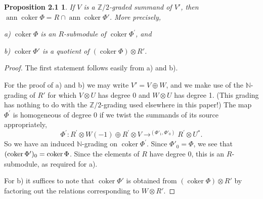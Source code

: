 \documentclass{tran-l}
\theoremstyle{plain}
\newtheorem*{theorem11}{Proposition 2.1}
\theoremstyle{remark}
\theoremstyle{definition}
\newcommand{\coker}{\operatorname{coker}}
\newcommand{\ann}{\operatorname{ann}}
\newcommand{\NN}{\mathbb {N}}
\newcommand{\ZZ}{\mathbb {Z}}
\begin{document}
\begin{theorem11}
If $V$ is a $\ZZ /2$-graded
summand of $V'$,
then
$\ann \coker \Phi =R\cap \ann \coker \Phi '$. More precisely,

\textup{a)} $\coker \Phi $ is an $R$-submodule of $\coker \Phi ^{\prime }$, and 

\textup{b)} $\coker \Phi '$ is a quotient of
$(\coker \Phi )\otimes R'$.
\end{theorem11}
\begin{proof} The first statement follows
easily from a) and b).

For the proof of a) and b) we may write
$V'=V\oplus W$, and we  make
use of the $\NN $-grading of $R'$ for which $V\otimes U$
has degree 0 and $W\otimes U$ has degree 1. (This grading
has nothing to do with the $\ZZ /2$-grading used elsewhere in
this paper!)
The map $\Phi ^{\prime }$ is homogeneous of degree 0 if
we twist the summands of its source appropriately,
\begin{equation*}\Phi ^{\prime }: R^{\prime }\otimes W(-1)\oplus R^{\prime }\otimes V
\to ^{(\Phi '_{1},\Phi '_{0})}
R^{\prime }\otimes U^{*}.
\end{equation*}
So we have an induced $\NN $-grading on $\coker \Phi ^{\prime }$.
Since $\Phi '_{0}=\Phi $, we see that $(\coker \Phi ')_{0}\linebreak
=\coker \Phi $.
Since the elements of $R$ have degree 0, this is an $R$-submodule,
as required for a).

For b) it suffices to note that $\coker \Phi '$ is obtained
from $(\coker \Phi )\otimes R'$ by factoring out the relations
corresponding to $W\otimes R'$.\end{proof}
\end{document}
